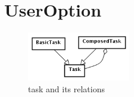 \section{UserOption}
\label{sec:userOption}

\begin{figure}[h!] 
	\centering
	\includegraphics[width=0.4\textwidth]{../TaskDetail.png}
	\caption{task and its relations}
	\label{fig:task} 
\end{figure}